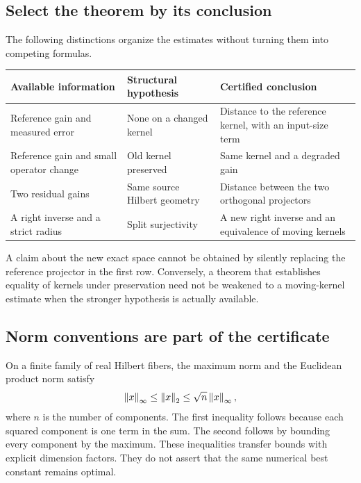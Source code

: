 
\subsection{Select the theorem by its conclusion}
The following distinctions organize the estimates without turning them into competing formulas.
\begin{center}
\begin{tabularx}{\linewidth}{@{}p{.29\linewidth}p{.32\linewidth}X@{}}
\toprule
Available information & Structural hypothesis & Certified conclusion\\
\midrule
Reference gain and measured error & None on a changed kernel & Distance to the reference kernel, with an input-size term\\
Reference gain and small operator change & Old kernel preserved & Same kernel and a degraded gain\\
Two residual gains & Same source Hilbert geometry & Distance between the two orthogonal projectors\\
A right inverse and a strict radius & Split surjectivity & A new right inverse and an equivalence of moving kernels\\
\bottomrule
\end{tabularx}
\end{center}
A claim about the new exact space cannot be obtained by silently replacing the reference projector in the first row. Conversely, a theorem that establishes equality of kernels under preservation need not be weakened to a moving-kernel estimate when the stronger hypothesis is actually available.

\subsection{Norm conventions are part of the certificate}
On a finite family of real Hilbert fibers, the maximum norm and the Euclidean product norm satisfy
\[
 \left\lVert x\right\rVert_\infty\le\left\lVert x\right\rVert_2\le\sqrt{n}\left\lVert x\right\rVert_\infty,
\]
where \(n\) is the number of components. The first inequality follows because each squared component is one term in the sum. The second follows by bounding every component by the maximum. These inequalities transfer bounds with explicit dimension factors. They do not assert that the same numerical best constant remains optimal.

